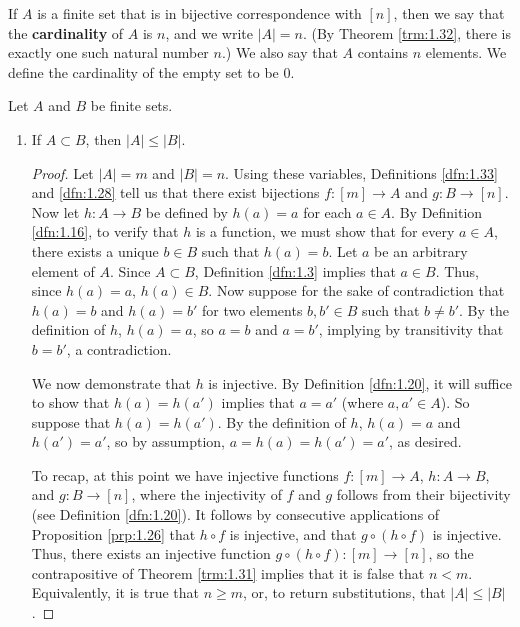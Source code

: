 \documentclass[../main.tex]{subfiles}
\begin{document}
\begin{definition}\label{dfn:1.33}
    If $A$ is a finite set that is in bijective correspondence with $[n]$, then we say that the \textbf{cardinality} of $A$ is $n$, and we write $|A|=n$. (By Theorem \ref{trm:1.32}, there is exactly one such natural number $n$.) We also say that $A$ contains $n$ elements. We define the cardinality of the empty set to be 0.
\end{definition}

\begin{exercise}\label{trm:1.34}
    Let $A$ and $B$ be finite sets.
    \begin{enumerate}[label={\alph*)},ref={\thetheorem\alph*}]
        \item \label{trm:1.34a}If $A\subset B$, then $|A|\leq|B|$.
        \begin{proof}
            Let $|A|=m$ and $|B|=n$. Using these variables, Definitions \ref{dfn:1.33} and \ref{dfn:1.28} tell us that there exist bijections $f:[m]\to A$ and $g:B\to[n]$. Now let $h:A\to B$ be defined by $h(a)=a$ for each $a\in A$. By Definition \ref{dfn:1.16}, to verify that $h$ is a function, we must show that for every $a\in A$, there exists a unique $b\in B$ such that $h(a)=b$. Let $a$ be an arbitrary element of $A$. Since $A\subset B$, Definition \ref{dfn:1.3} implies that $a\in B$. Thus, since $h(a)=a$, $h(a)\in B$. Now suppose for the sake of contradiction that $h(a)=b$ and $h(a)=b'$ for two elements $b,b'\in B$ such that $b\neq b'$. By the definition of $h$, $h(a)=a$, so $a=b$ and $a=b'$, implying by transitivity that $b=b'$, a contradiction.\par
            We now demonstrate that $h$ is injective. By Definition \ref{dfn:1.20}, it will suffice to show that $h(a)=h(a')$ implies that $a=a'$ (where $a,a'\in A$). So suppose that $h(a)=h(a')$. By the definition of $h$, $h(a)=a$ and $h(a')=a'$, so by assumption, $a=h(a)=h(a')=a'$, as desired.\par
            To recap, at this point we have injective functions $f:[m]\to A$, $h:A\to B$, and $g:B\to [n]$, where the injectivity of $f$ and $g$ follows from their bijectivity (see Definition \ref{dfn:1.20}). It follows by consecutive applications of Proposition \ref{prp:1.26} that $h\circ f$ is injective, and that $g\circ (h\circ f)$ is injective. Thus, there exists an injective function $g\circ (h\circ f):[m]\to[n]$, so the contrapositive of Theorem \ref{trm:1.31} implies that it is false that $n<m$. Equivalently, it is true that $n\geq m$, or, to return substitutions, that $|A|\leq|B|$.

\end{proof}
\end{enumerate}
\end{exercise}
\end{document}
